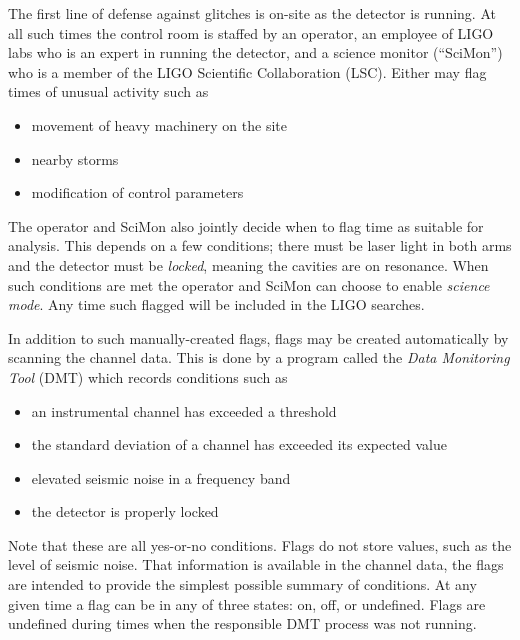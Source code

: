 The first line of defense against glitches is on-site as the
detector is running.  At all such times the control room is staffed
by an operator, an employee of LIGO labs who is an expert in running
the detector, and a science monitor
(``SciMon'') who is a member of the LIGO Scientific Collaboration
(LSC).  Either may flag times of unusual activity such as

\begin{itemize}
\item movement of heavy machinery on the site 
\item nearby storms 
\item modification of control parameters 
\end{itemize}
%
The operator and SciMon also jointly decide when to flag time as
suitable for analysis.  This depends on a few conditions; there must
be laser light in both arms and the detector must be \emph{locked},
meaning the cavities are on resonance.  When such conditions are met
the operator and SciMon can choose to enable \emph{science mode}.  Any
time such flagged will be included in the LIGO searches.

In addition to such manually-created flags, flags may be created
automatically by scanning the channel data.  This is done by a program
called the \emph{Data Monitoring Tool} (DMT) which records conditions
such as
%
\begin{itemize}
\item an instrumental channel has exceeded a threshold
\item the standard deviation of a channel has exceeded its expected
value
\item elevated seismic noise in a frequency band
\item the detector is properly locked
\end{itemize}
%
Note that these are all yes-or-no conditions.  Flags do not store
values, such as the level of seismic noise.  That information is
available in the channel data, the flags are intended to provide the
simplest possible summary of conditions.  At any given time a flag can
be in any of three states: on, off, or undefined.  Flags are undefined
during times when the responsible DMT process was not running.

